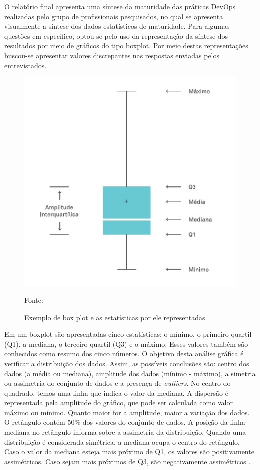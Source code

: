 \documentclass[twoside,english,brazilian]{UNISINOSartigo}
\newcommand{\source}[1]{\caption*{Fonte: {#1}} }
\begin{document}
O relatório final apresenta uma síntese da maturidade das práticas DevOps realizadas pelo grupo de profissionais pesquisados, no qual se apresenta visualmente a síntese dos dados estatísticos de maturidade. Para algumas questões em específico, optou-se pelo uso da representação da síntese dos resultados por meio de gráficos do tipo boxplot. Por meio destas representações buscou-se apresentar valores discrepantes nas respostas enviadas pelos entrevistados.

\begin{figure}[H]
    \centering
    \caption{Exemplo de box plot e as estatísticas por ele representadas}
       \includegraphics[scale=.6]{imagens/resumo-cinco-numeros-box-plot.jpg}
        \source{}
\end{figure}

Em um boxplot são apresentadas cinco estatísticas: o mínimo, o primeiro quartil (Q1), a mediana, o terceiro quartil (Q3) e o máximo. Esses valores também são conhecidos como resumo dos cinco números.
O objetivo desta análise gráfica é verificar a distribuição dos dados. Assim, as possíveis conclusões são: centro dos dados (a média ou mediana), amplitude dos dados (mínimo - máximo), a simetria ou assimetria do conjunto de dados e a presença de \textit{outliers}.
No centro do quadrado, temos uma linha que indica o valor da mediana. A dispersão é representada pela amplitude do gráfico, que pode ser calculada como valor máximo ou mínimo. Quanto maior for a amplitude, maior a variação dos dados.
O retângulo contém 50\% dos valores do conjunto de dados. A posição da linha mediana no retângulo informa sobre a assimetria da distribuição. Quando uma distribuição é considerada simétrica, a mediana ocupa o centro do retângulo. Caso o valor da mediana esteja mais próximo de Q1, os valores são positivamente assimétricos. Caso sejam mais próximos de Q3, são negativamente assimétricos \cite{EDTIBoxPlot}.
\end{document}
